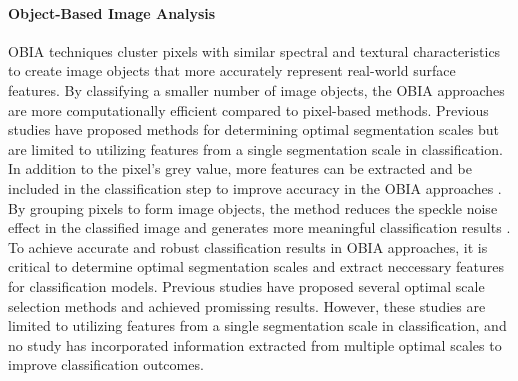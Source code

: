 


\paragraph{Object-Based Image Analysis}
OBIA techniques cluster pixels with similar spectral and textural characteristics to create image objects that more accurately represent real-world surface features. By classifying a smaller number of image objects, the OBIA approaches are more computationally efficient compared to pixel-based methods. Previous studies have proposed methods for determining optimal segmentation scales but are limited to utilizing features from a single segmentation scale in classification. In addition to the pixel's grey value, more features can be extracted and be included in the classification step to improve accuracy in the OBIA approaches \citep{20-photo-j, dao2019, dao2015}. By grouping pixels to form image objects, the method reduces the speckle noise effect in the classified image and generates more meaningful classification results \citep{he2015}. To achieve accurate and robust classification results in OBIA approaches, it is critical to determine optimal segmentation scales and extract neccessary features for classification models. Previous studies \citep{20-photo-j, draguct2010esp, sellars2020, wan2019multiscaledynamicgraphconvolutional, zhang2021hyperspectralimagesegmentationbased} have proposed several optimal scale selection methods and achieved promissing results. However, these studies are limited to utilizing features from a single segmentation scale in classification, and no study has incorporated information extracted from multiple optimal scales to improve classification outcomes.

